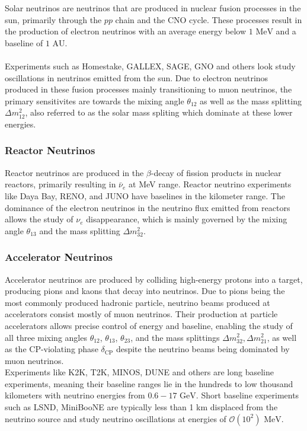 \documentclass[a4paper,12pt,numbered]{article}
\begin{document}
Solar neutrinos are neutrinos that are produced in nuclear fusion processes in the sun, primarily through the $pp$ chain and the CNO cycle. These processes result in the production of electron neutrinos with an average energy below $1 \text{ MeV}$ and a baseline of $1 \text{ AU}$.
\\ \\
Experiments such as Homestake, GALLEX, SAGE, GNO and others look study oscillations in neutrinos emitted from the sun. Due to electron neutrinos produced in these fusion processes mainly transitioning to muon neutrinos, the primary sensitivites are towards the mixing angle $\theta_{12}$ as well as the mass splitting $\Delta m_{12}^2$, also referred to as the solar mass spliting which dominate at these lower energies.

\subsubsection{Reactor Neutrinos}

Reactor neutrinos are produced in the $\beta$-decay of fission products in nuclear reactors, primarily resulting in $\bar{\nu}_e$ at MeV range. Reactor neutrino experiments like Daya Bay, RENO, and JUNO have baselines in the kilometer range. The dominance of the electron neutrinos in the neutrino flux emitted from reactors allows the study of $\nu_e$ disappearance, which is mainly governed by the mixing angle $\theta_{13}$ and the mass splitting $\Delta m^2_{32}$. 

\subsubsection{Accelerator Neutrinos}

Accelerator neutrinos are produced by colliding high-energy protons into a target, producing pions and kaons that decay into neutrinos. Due to pions being the most commonly produced hadronic particle, neutrino beams produced at accelerators consist mostly of muon neutrinos. Their production at particle accelerators allows precise control of energy and baseline, enabling the study of all three mixing angles $\theta_{12}$, $\theta_{13}$, $\theta_{23}$, and the mass splittings $\Delta m^2_{32},\Delta m^2_{21}$, as well as the CP-violating phase $\delta_{\text{CP}}$ despite the neutrino beams being dominated by muon neutrinos. 
\\
Experiments like K2K, T2K, MINOS, DUNE and others are long baseline experiments, meaning their baseline ranges lie in the hundreds to low thousand kilometers with neutrino energies from $0.6-17 \text{ GeV}$. Short baseline experiments such as LSND, MiniBooNE are typically less than 1 km displaced from the neutrino source and study neutrino oscillations at energies of $\mathcal{O}(10^2) \text{ MeV}$.
\end{document}
